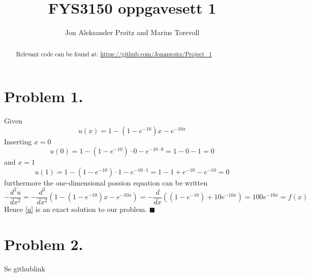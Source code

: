 \documentclass[english,notitlepage]{revtex4-1}  %
\begin{document}
\title{FYS3150 oppgavesett 1}

\author{Jon Aleksander Prøitz and Marius Torsvoll}

\begin{abstract}
\noindent Relevant code can be found at:
\url{https://github.com/Jonaproitz/Project_1}
\end{abstract}

\maketitle


\section*{Problem 1.}
    \label{sec:oppgave1}
    Given
    \begin{equation}
            u(x) 
        =   1-(1-e^{-10})x - e^{-10x}
        \label{u}
    \end{equation}
    Inserting $x = 0$ 
    \begin{equation*}
            u(0)
        =   1 - (1 - e^{-10}) \cdot 0 - e^{-10 \cdot 0}
        =   1 - 0 - 1
        =   0
    \end{equation*}
    and $x = 1$
    \begin{equation*}
            u(1)
        =   1 - (1 - e^{-10}) \cdot 1 - e^{-10 \cdot 1}
        =   1 - 1 + e^{-10} - e^{-10}
        =   0
    \end{equation*}
    furthermore the one-dimensional possion equation can be written
    \begin{equation*}
            -\frac{d^2 u}{d x^2} 
        =   -\frac{d^2}{d x^2}\left(1-(1-e^{-10})x - e^{-10x}\right)
        =   -\frac{d}{d x}\left((1-e^{-10}) + 10e^{-10x} \right) 
        =   100e^{-10x}
        =   f(x)
    \end{equation*}
    Hence \ref{u} is an exact solution to our problem.
    \hfill$\blacksquare$


\section*{Problem 2.}
    \label{sec:oppgave2}
    Se githublink 
\end{document}
